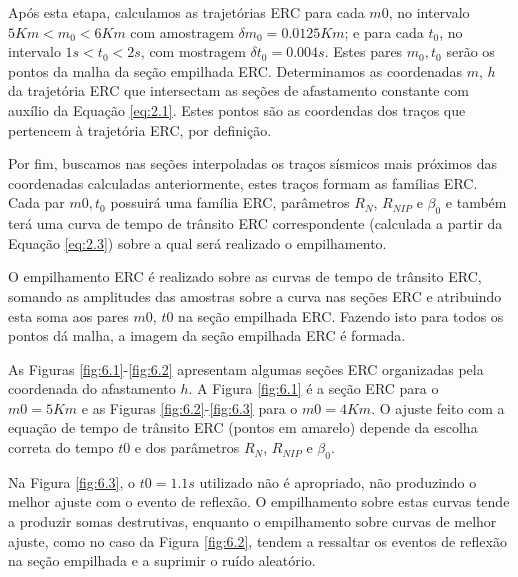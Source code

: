 Após esta etapa, calculamos as trajetórias ERC para cada $m0$, no intervalo $5Km<m_0<6Km$ com amostragem
$\delta m_0 = 0.0125Km$; e para cada $t_0$, no intervalo $1s<t_0<2s$, com mostragem $\delta t_0 = 0.004s$.
Estes pares $m_0, t_0$ serão os pontos da malha da seção empilhada ERC.
Determinamos as coordenadas $m$, $h$ da trajetória ERC que intersectam as seções de afastamento constante com
auxílio da Equação \ref{eq:2.1}.
Estes pontos são as coordendas dos traços que pertencem à trajetória ERC, por definição.

Por fim, buscamos nas seções interpoladas
os traços sísmicos mais próximos das coordenadas calculadas anteriormente, estes traços formam as famílias ERC. 
Cada par $m0, t_0$ possuirá uma família ERC, parâmetros $R_N$, $R_{NIP}$ e $\beta_0$ e também terá uma curva de tempo
de trânsito ERC correspondente (calculada a partir da Equação \ref{eq:2.3}) sobre a qual será realizado o empilhamento.

O empilhamento ERC é realizado sobre as curvas de tempo de trânsito ERC, somando as amplitudes
das amostras sobre a curva nas seções ERC e atribuindo esta soma aos pares $m0$, $t0$ na seção empilhada ERC.
Fazendo isto para todos os pontos dá malha, a imagem da seção empilhada ERC é formada.

As Figuras \ref{fig:6.1}-\ref{fig:6.2} apresentam algumas seções ERC organizadas pela coordenada do afastamento $h$. A Figura
\ref{fig:6.1} é a seção ERC para o $m0=5Km$ e as Figuras \ref{fig:6.2}-\ref{fig:6.3} para o $m0=4Km$. O ajuste feito com
a equação de tempo de trânsito ERC (pontos em amarelo) depende da escolha correta do tempo $t0$ e dos parâmetros
$R_N$, $R_{NIP}$ e $\beta_0$. 

Na Figura \ref{fig:6.3}, 
o $t0=1.1s$ utilizado não é apropriado, não produzindo o melhor ajuste com o evento de reflexão.
O empilhamento sobre estas curvas tende a produzir somas destrutivas, enquanto o empilhamento
sobre curvas de melhor ajuste, como no caso da Figura \ref{fig:6.2},
tendem a ressaltar os eventos de reflexão na seção empilhada e a suprimir o ruído aleatório.

